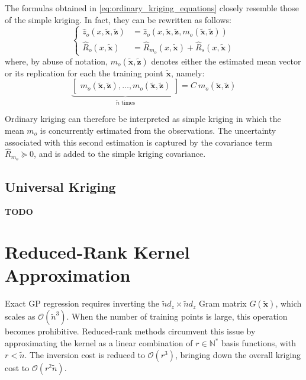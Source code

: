 \begin{remark}\label{th:ordinary_simple_kriging_link}
	The formulas obtained in \eqref{eq:ordinary_kriging_equations} closely resemble those of the simple kriging. In fact, they can be rewritten as follows:
	\begin{equation}
		\left\{\begin{aligned}
		\hat{z}_o(x,\tilde{\mathbf{x}},\tilde{\mathbf{z}})&=\hat{z}_o(x,\tilde{\mathbf{x}},\tilde{\mathbf{z}},m_o(\tilde{\mathbf{x}},\tilde{\mathbf{z}}))\\
		\hat{R}_o(x,\tilde{\mathbf{x}})&=\hat{R}_{m_o}(x,\tilde{\mathbf{x}})+\hat{R}_s(x,\tilde{\mathbf{x}})
		\end{aligned}\right.
	\end{equation}
	where, by abuse of notation, $m_o(\tilde{\mathbf{x}},\tilde{\mathbf{z}})$ denotes either the estimated mean vector or its replication for each the training point $\tilde{\mathbf{x}}$, namely:
	\begin{equation}
		\underbrace{\begin{bmatrix}
		m_o(\tilde{\mathbf{x}},\tilde{\mathbf{z}}),\dots,m_o(\tilde{\mathbf{x}},\tilde{\mathbf{z}})
		\end{bmatrix}}_{\tilde{n}\text{ times}}=C\:m_o(\tilde{\mathbf{x}},\tilde{\mathbf{z}})
	\end{equation}

	Ordinary kriging can therefore be interpreted as simple kriging in which the mean $m_o$ is concurrently estimated from the observations. The uncertainty associated with this second estimation is captured by the covariance term $\hat{R}_{m_o}\succeq0$, and is added to the simple kriging covariance.
\end{remark}

\subsection{Universal Kriging}

\textbf{TODO}

\section{Reduced-Rank Kernel Approximation}\label{sec:reduced_rank}

Exact GP regression requires inverting the $\tilde{n}d_z\times\tilde{n}d_z$ Gram matrix $G(\tilde{\mathbf{x}})$, which scales as $\mathcal{O}\left(\tilde{n}^3\right)$. When the number of training points is large, this operation becomes prohibitive. Reduced-rank methods circumvent this issue by approximating the kernel as a linear combination of $r\in\mathbb{N}^*$ basis functions, with $r<\tilde{n}$. The inversion cost is reduced to $\mathcal{O}\left(r^3\right)$, bringing down the overall kriging cost to $\mathcal{O}\left(r^2\tilde{n}\right)$.

